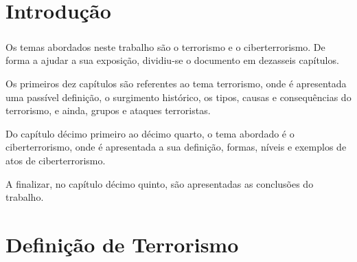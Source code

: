 \documentclass{report}
\begin{document}
\tableofcontents

\clearpage
{}



\chapter{Introdução}
\label{chap.introducao}

\paragraph{} Os temas abordados neste trabalho são o terrorismo e o ciberterrorismo. De forma a ajudar a sua exposição, dividiu-se o documento em dezasseis capítulos.\par
Os primeiros dez capítulos são referentes ao tema terrorismo, onde é apresentada uma passível definição, o surgimento histórico, os tipos, causas e consequências do terrorismo, e ainda, grupos e ataques terroristas.\par
Do capítulo décimo primeiro ao décimo quarto, o tema abordado é o ciberterrorismo, onde é apresentada a sua definição, formas, níveis e exemplos de atos de ciberterrorismo.\par
A finalizar, no capítulo décimo quinto, são apresentadas as conclusões do trabalho.



\chapter{Definição de Terrorismo}
\label{chap.Definição de Terrorismo}
\end{document}
